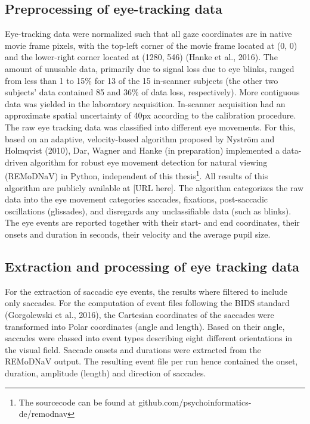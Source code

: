 \documentclass[a4paper, 11pt]{scrreprt}
\begin{document}
\subsection{Preprocessing of eye-tracking data}
Eye-tracking data were normalized such that all gaze coordinates are in native movie frame pixels, with the top-left corner of the movie frame located at (0, 0) and the lower-right corner located at (1280, 546) (Hanke et al., 2016). The amount of unusable data, primarily due to signal loss due to eye blinks, ranged from less than 1 to 15\% for 13 of the 15 in-scanner subjects (the other two subjects’ data contained 85 and 36\% of data loss, respectively). More contiguous data was yielded in the laboratory acquisition. In-scanner acquisition had an approximate spatial uncertainty of 40px according to the calibration procedure. \newline
The raw eye tracking data was classified into different eye movements. For this, based on an adaptive, velocity-based algorithm proposed by Nyström and Holmqvist (2010), Dar, Wagner and  Hanke (in preparation) implemented a data-driven algorithm for robust eye movement detection for natural viewing (REMoDNaV) in Python, independent of this thesis\footnote{The sourcecode can be found at github.com/psychoinformatics-de/remodnav}. All results of this algorithm are publicly available at [URL here]. The algorithm categorizes the raw data into the eye movement categories saccades, fixations, post-saccadic oscillations (glissades), and disregards any unclassifiable data (such as blinks). The eye events are reported together with their start- and end coordinates, their onsets and duration in seconds, their velocity and the average pupil size.

\subsection{Extraction and processing of eye tracking data}

For the extraction of saccadic eye events, the results where filtered to include only saccades. For the computation of event files following the BIDS standard (Gorgolewski et al., 2016), the Cartesian coordinates of the saccades were transformed into Polar coordinates (angle and length). Based on their angle, saccades were classed into event types describing eight different orientations in the visual field. Saccade onsets and durations were extracted from the REMoDNaV output. The resulting event file per run hence contained the onset, duration, amplitude (length) and direction of saccades. \newline
\end{document}
